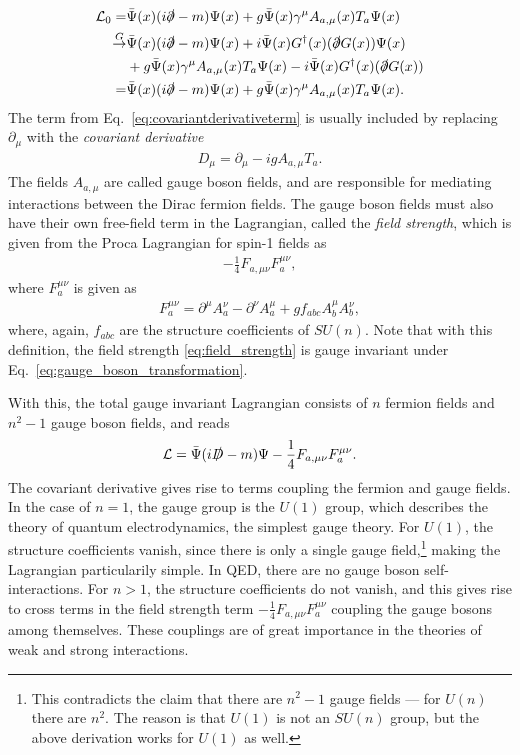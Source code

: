 \documentclass[twoside,english]{uiofysmaster}
\begin{document}
\begin{align}
	\mathcal{L}_0 = &\bar\Psi(x)(i\slashed\partial - m)\Psi(x) + g\bar\Psi(x) \gamma^\mu A_{a,\mu}(x) T_a \Psi(x)\nonumber\\
	\overset{G}{\to} &\bar\Psi(x)(i\slashed\partial - m)\Psi(x) + i\bar\Psi(x) G^\dag(x) (\slashed \partial G(x)) \Psi(x)\\
	 &+ g\bar\Psi(x) \gamma^\mu A_{a,\mu}(x) T_a \Psi(x) -  i\bar\Psi(x) G^\dag(x) (\slashed \partial G(x)) \nonumber\\
	 = &\bar\Psi(x)(i\slashed\partial - m)\Psi(x) + g\bar\Psi(x) \gamma^\mu A_{a,\mu}(x) T_a \Psi(x).\nonumber
\end{align}
The term from Eq.\ \eqref{eq:covariantderivativeterm} is usually included by replacing $\partial_\mu$ with the {\it covariant derivative}
\begin{align}
	D_\mu = \partial_\mu - ig A_{a,\mu}T_a.
\end{align}
The fields $A_{a,\mu}$ are called gauge boson fields, and are responsible for mediating interactions between the Dirac fermion fields. The gauge boson fields must also have their own free-field term in the Lagrangian, called the {\it field strength}, which is given from the Proca Lagrangian for spin-1 fields as 
\begin{align}
	-\frac{1}{4} F_{a,\mu\nu} F_a^{\mu\nu},\label{eq:field_strength}
\end{align}
where $F_a^{\mu\nu}$ is given as
\begin{align}
	F_a^{\mu\nu} = \partial^\mu A^\nu_a - \partial^\nu A^\mu_a + g f_{abc}A^\mu_b A^\nu_b,
\end{align}
where, again, $f_{abc}$ are the structure coefficients of $SU(n)$. Note that with this definition, the field strength \eqref{eq:field_strength} is gauge invariant under Eq.\ \ref{eq:gauge_boson_transformation}.

With this, the total gauge invariant Lagrangian consists of $n$ fermion fields and $n^2-1$ gauge boson fields, and reads
\begin{align}
	\mathcal{L} = \bar\Psi(i\slashed D - m)\Psi - \frac{1}{4} F_{a,\mu\nu} F_a^{\mu\nu}.
\end{align}
The covariant derivative gives rise to terms coupling the fermion and gauge fields. In the case of $n=1$, the gauge group is the $U(1)$ group, which describes the theory of quantum electrodynamics, the simplest gauge theory. For $U(1)$, the structure coefficients vanish, since there is only a single gauge field,\footnote{This contradicts the claim that there are $n^2-1$ gauge fields --- for $U(n)$ there are $n^2$. The reason is that $U(1)$ is not an $SU(n)$ group, but the above derivation works for $U(1)$ as well.} making the Lagrangian particularily simple. In QED, there are no gauge boson self-interactions. For $n>1$, the structure coefficients do not vanish, and this gives rise to cross terms in the field strength term $-\frac{1}{4} F_{a,\mu\nu} F_a^{\mu\nu}$ coupling the gauge bosons among themselves. These couplings are of great importance in the theories of weak and strong interactions.
\end{document}
